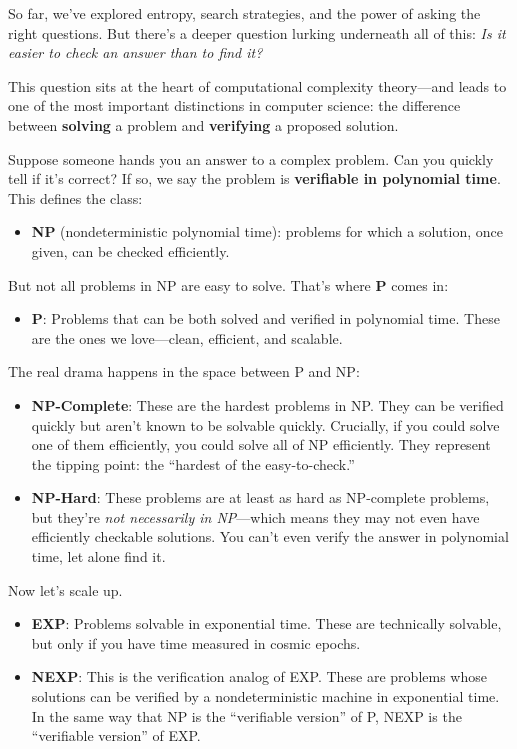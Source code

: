 So far, we've explored entropy, search strategies, and the power of asking the right questions. But there's a deeper question lurking underneath all of this: \emph{Is it easier to check an answer than to find it?}

This question sits at the heart of computational complexity theory—and leads to one of the most important distinctions in computer science: the difference between \textbf{solving} a problem and \textbf{verifying} a proposed solution.

\medskip

\noindent Suppose someone hands you an answer to a complex problem. Can you quickly tell if it's correct? If so, we say the problem is \textbf{verifiable in polynomial time}. This defines the class:

\begin{itemize}
  \item \textbf{NP} (nondeterministic polynomial time): problems for which a solution, once given, can be checked efficiently.
\end{itemize}

But not all problems in NP are easy to solve. That's where \textbf{P} comes in:

\begin{itemize}
  \item \textbf{P}: Problems that can be both solved and verified in polynomial time. These are the ones we love—clean, efficient, and scalable.
\end{itemize}

The real drama happens in the space between P and NP:

\begin{itemize}
  \item \textbf{NP-Complete}: These are the hardest problems in NP. They can be verified quickly but aren’t known to be solvable quickly. Crucially, if you could solve one of them efficiently, you could solve all of NP efficiently. They represent the tipping point: the “hardest of the easy-to-check.”
  \item \textbf{NP-Hard}: These problems are at least as hard as NP-complete problems, but they’re \emph{not necessarily in NP}—which means they may not even have efficiently checkable solutions. You can’t even verify the answer in polynomial time, let alone find it.
\end{itemize}

Now let’s scale up.

\begin{itemize}
  \item \textbf{EXP}: Problems solvable in exponential time. These are technically solvable, but only if you have time measured in cosmic epochs.
  \item \textbf{NEXP}: This is the verification analog of EXP. These are problems whose solutions can be verified by a nondeterministic machine in exponential time. In the same way that NP is the “verifiable version” of P, NEXP is the “verifiable version” of EXP.
\end{itemize}

